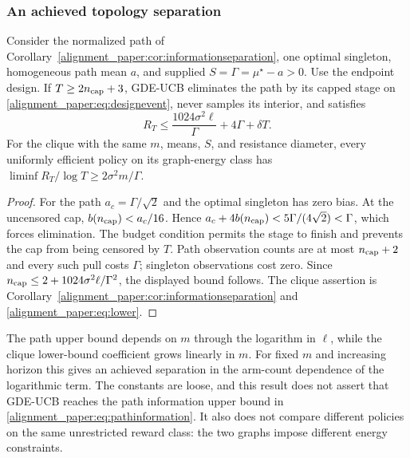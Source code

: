 \subsubsection{An achieved topology separation}
\begin{corollary}
Consider the normalized path of Corollary~\ref{alignment_paper:cor:informationseparation}, one optimal singleton, homogeneous path mean $a$, and supplied $S=\Gamma=\mu^\star-a>0$. Use the endpoint design. If $T\ge2n_{\rm cap}+3$, GDE-UCB eliminates the path by its capped stage on \eqref{alignment_paper:eq:designevent}, never samples its interior, and satisfies
\begin{equation}
 R_T\le\frac{1024\sigma^2\ell}{\Gamma}+4\Gamma+\delta T.
 \label{alignment_paper:eq:achievedpath}
\end{equation}
For the clique with the same $m$, means, $S$, and resistance diameter, every uniformly efficient policy on its graph-energy class has
$\liminf R_T/\log T\ge2\sigma^2m/\Gamma$.
\label{alignment_paper:cor:achievedseparation}
\end{corollary}
\begin{proof}
For the path $a_c=\Gamma/\sqrt2$ and the optimal singleton has zero bias. At the uncensored cap, $b(n_{\rm cap})<a_c/16$. Hence
$a_c+4b(n_{\rm cap})<5\Gamma/(4\sqrt2)<\Gamma$, which forces elimination. The budget condition permits the stage to finish and prevents the cap from being censored by $T$. Path observation counts are at most $n_{\rm cap}+2$ and every such pull costs $\Gamma$; singleton observations cost zero. Since $n_{\rm cap}\le2+1024\sigma^2\ell/\Gamma^2$, the displayed bound follows. The clique assertion is Corollary~\ref{alignment_paper:cor:informationseparation} and \eqref{alignment_paper:eq:lower}.
\end{proof}
The path upper bound depends on $m$ through the logarithm in $\ell$, while the clique lower-bound coefficient grows linearly in $m$. For fixed $m$ and increasing horizon this gives an achieved separation in the arm-count dependence of the logarithmic term. The constants are loose, and this result does not assert that GDE-UCB reaches the path information upper bound in \eqref{alignment_paper:eq:pathinformation}. It also does not compare different policies on the same unrestricted reward class: the two graphs impose different energy constraints.

